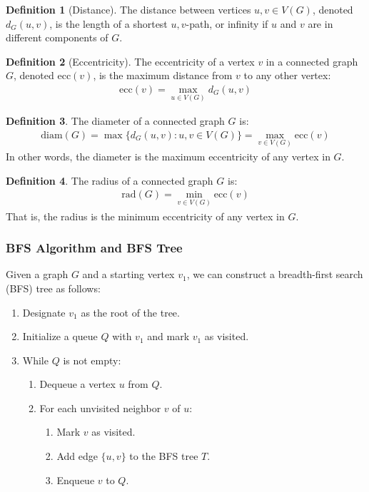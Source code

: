 \documentclass{article}
\theoremstyle{definition}
\newtheorem{definition}{Definition}
\begin{document}
\begin{definition}[Distance]
The distance between vertices $u, v \in V(G)$, denoted $d_G(u,v)$, is the length of a shortest $u,v$-path, or infinity if $u$ and $v$ are in different components of $G$.
\end{definition}

\begin{definition}[Eccentricity]
The eccentricity of a vertex $v$ in a connected graph $G$, denoted $\text{ecc}(v)$, is the maximum distance from $v$ to any other vertex:
\begin{align*}
\text{ecc}(v) = \max_{u \in V(G)} d_G(u,v)
\end{align*}
\end{definition}

\begin{definition}
The diameter of a connected graph $G$ is:
\begin{align*}
\text{diam}(G) = \max\{d_G(u,v) : u,v \in V(G)\} = \max_{v \in V(G)} \text{ecc}(v)
\end{align*}
In other words, the diameter is the maximum eccentricity of any vertex in $G$.
\end{definition}
\begin{definition}
The radius of a connected graph $G$ is:
\begin{align*}
\text{rad}(G) = \min_{v \in V(G)} \text{ecc}(v)
\end{align*}
That is, the radius is the minimum eccentricity of any vertex in $G$.
\end{definition}
\subsubsection{BFS Algorithm and BFS Tree}

Given a graph $G$ and a starting vertex $v_1$, we can construct a breadth-first search (BFS) tree as follows:

\begin{enumerate}
\item Designate $v_1$ as the root of the tree.
\item Initialize a queue $Q$ with $v_1$ and mark $v_1$ as visited.
\item While $Q$ is not empty:
   \begin{enumerate}
   \item Dequeue a vertex $u$ from $Q$.
   \item For each unvisited neighbor $v$ of $u$:
      \begin{enumerate}
      \item Mark $v$ as visited.
      \item Add edge $\{u,v\}$ to the BFS tree $T$.
      \item Enqueue $v$ to $Q$.
      \end{enumerate}
   \end{enumerate}
\end{enumerate}
\end{document}
